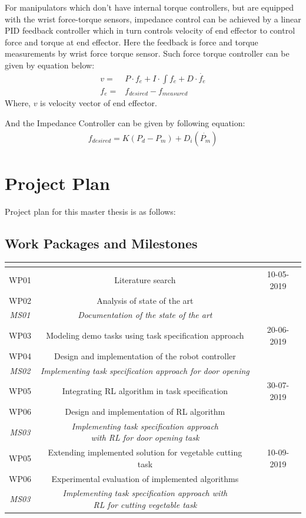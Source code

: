 \documentclass[thesis]{mas_proposal}
\begin{document}
For manipulators which don't have internal torque controllers, but are equipped with the wrist force-torque sensors, impedance control can be achieved by a linear PID feedback controller which in turn controls velocity of end effector to control force and torque at end effector. Here the feedback is force and torque measurements by wrist force torque sensor. Such force torque controller can be given by equation below:
\begin{align}
	v =& P \cdot f_{e} + I \cdot \int f_{e} + D \cdot \dot{f_{e}} \\
	f_{e} =& f_{desired} - f_{measured}
\end{align}   
Where, $v$ is velocity vector of end effector.

And the Impedance Controller can be given by following equation:
\begin{align}
	f_{desired} = K(P_{d} - P_{m}) + D_{i}(\dot{P_{m}})
\end{align}



\chapter{Project Plan}
Project plan for this master thesis is as follows:
\section{Work Packages and Milestones}

\begin{tabular}{|c|c|c|}

	\hline
	\multicolumn{2}{|c|}{\thead{Work Packages}} & \thead{Targeted date} \\
	\hline
	WP01 & Literature search & 10-05-2019 \\
	WP02 & Analysis of state of the art &  \\
	\textit{MS01} & \textit{Documentation of the state of the art} &  \\
	\hline 
	WP03 & Modeling demo tasks using task specification approach &  20-06-2019\\ 
	WP04 & Design and implementation of the robot controller &   \\
	\textit{MS02} & \textit{Implementing task specification approach for door opening} &  \\
	\hline
	WP05 & Integrating RL algorithm in task specification & 30-07-2019 \\ 
	WP06 & Design and implementation of RL algorithm &   \\
	\textit{MS03} & \makecell{\textit{Implementing task specification approach} \\ \textit{with RL for door opening task}} &  \\
	\hline
	WP05 & Extending implemented solution for vegetable cutting task & 10-09-2019 \\ 
	WP06 & Experimental evaluation of implemented algorithms &  \\
	\textit{MS03} & \makecell{\textit{Implementing task specification approach with} \\ \textit{RL for cutting vegetable task}} &  \\
	\hline
\end{tabular}
\end{document}
